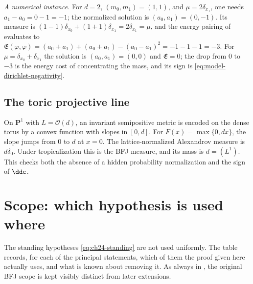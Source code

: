 \begin{example}
\emph{A numerical instance.}  For \(d=2\), \((m_0,m_1)=(1,1)\), and
\(\mu=2\delta_{x_1}\), one needs \(a_1-a_0=0-1=-1\); the normalized solution
is \((a_0,a_1)=(0,-1)\).  Its measure is
\((1-1)\delta_{x_0}+(1+1)\delta_{x_1}=2\delta_{x_1}=\mu\), and the energy
pairing of  evaluates to
\(\mathfrak E(\varphi,\varphi)=(a_0+a_1)+(a_0+a_1)-(a_0-a_1)^2
 =-1-1-1=-3\).
For \(\mu=\delta_{x_0}+\delta_{x_1}\) the solution is
\((a_0,a_1)=(0,0)\) and \(\mathfrak E=0\); the drop from \(0\) to \(-3\)
is the energy cost of concentrating the mass, and its sign is
\eqref{eq:model-dirichlet-negativity}.
\end{example}

\subsection{The toric projective line}
\label{sec:ch24-ex-toric-p1}

\begin{example}
\label{ex:ch24-toric-p1}
On \(\mathbf P^1\) with \(L=\mathcal O(d)\), an invariant semipositive metric
is encoded on the dense torus by a convex function with slopes in
\([0,d]\). For \(F(x)=\max\{0,dx\}\), the slope jumps from \(0\) to \(d\)
at \(x=0\). The lattice-normalized Alexandrov measure is \(d\delta_0\).
Under tropicalization this is the BFJ measure, and its mass is
\(d=(L^1)\). This checks both the absence of a hidden probability
normalization and the sign of \(\ddc\).
\end{example}

\section{Scope: which hypothesis is used where}
\label{sec:ch24-scope}

The standing hypotheses \eqref{eq:ch24-standing} are not used uniformly.  The
table records, for each of the principal statements, which of them the proof
given here actually uses, and what is known about removing it.  As always in
, the original BFJ scope is kept visibly distinct from later
extensions.

